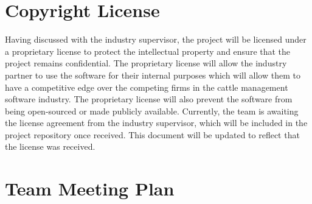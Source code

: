 \documentclass{article}
\begin{document}
\section{Copyright License}
Having discussed with the industry supervisor, the project will be licensed under a proprietary license to protect
 the intellectual property and ensure that the project remains confidential. The proprietary
  license will allow the industry partner to use the software for their internal purposes which will allow them to have a competitive edge over the competing firms in the cattle management software industry.
  The proprietary license will also prevent the software from being open-sourced or made publicly available. 
  Currently, the team is awaiting the license agreement from the industry supervisor, which will be included in the project repository once received. This document will be updated to reflect that the license was received.

\section{Team Meeting Plan}
\end{document}

